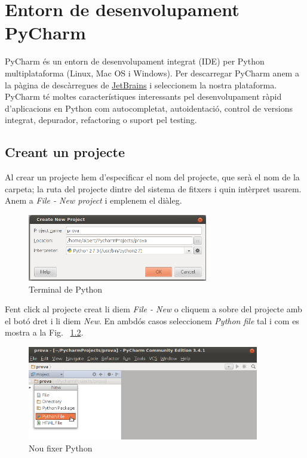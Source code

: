 \chapter{Entorn de desenvolupament PyCharm}

PyCharm és un entorn de desenvolupament integrat (IDE) per Python multiplataforma (Linux, Mac OS i Windows). Per descarregar PyCharm anem a la pàgina de descàrregues de \href{http://www.jetbrains.com/pycharm/download}{JetBrains} i seleccionem la nostra plataforma. PyCharm té moltes característiques interessants pel desenvolupament ràpid d'aplicacions en Python com
autocompletat, autoidentació, control de versions integrat, depurador, refactoring o suport pel testing.


\section{Creant un projecte}

Al crear un projecte hem d'especificar el nom del projecte, que serà el nom de la carpeta; la ruta del projecte dintre del sistema de fitxers i quin intèrpret usarem. Anem a \emph{File - New project} i emplenem el diàleg.

\begin{figure}[!h]
    \begin{centering}
    \includegraphics[width=0.7\textwidth]{img/projecte.png}
    \caption{Terminal de Python}
    \label{fig:projecte}
    \end{centering}
\end{figure}


Fent click al projecte creat li diem \emph{File - New} o cliquem a sobre del projecte amb el botó dret i li diem \emph{New}. En ambdós casos seleccionem \emph{Python file} tal i com es mostra a la Fig. ~\ref{fig:nou-fitxer}.


\begin{figure}[!h]
    \begin{centering}
    \includegraphics[width=0.9\textwidth]{img/now_fitxer.png}
    \caption{Nou fixer Python}
    \label{fig:nou-fitxer}
    \end{centering}
\end{figure}

